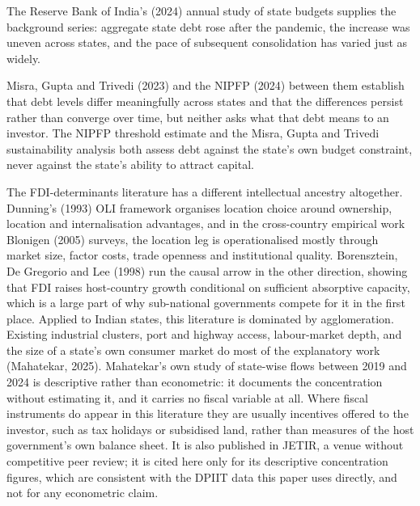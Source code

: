 \documentclass[12pt,a4paper]{article}
\begin{document}
The Reserve Bank of India's (2024) annual study of state budgets supplies the background series: aggregate state debt rose after the pandemic, the increase was uneven across states, and the pace of subsequent consolidation has varied just as widely.

Misra, Gupta and Trivedi (2023) and the NIPFP (2024) between them establish that debt levels differ meaningfully across states and that the differences persist rather than converge over time, but neither asks what that debt means to an investor. The NIPFP threshold estimate and the Misra, Gupta and Trivedi sustainability analysis both assess debt against the state's own budget constraint, never against the state's ability to attract capital.

The FDI-determinants literature has a different intellectual ancestry altogether. Dunning's (1993) OLI framework organises location choice around ownership, location and internalisation advantages, and in the cross-country empirical work Blonigen (2005) surveys, the location leg is operationalised mostly through market size, factor costs, trade openness and institutional quality. Borensztein, De Gregorio and Lee (1998) run the causal arrow in the other direction, showing that FDI raises host-country growth conditional on sufficient absorptive capacity, which is a large part of why sub-national governments compete for it in the first place. Applied to Indian states, this literature is dominated by agglomeration. Existing industrial clusters, port and highway access, labour-market depth, and the size of a state's own consumer market do most of the explanatory work (Mahatekar, 2025). Mahatekar's own study of state-wise flows between 2019 and 2024 is descriptive rather than econometric: it documents the concentration without estimating it, and it carries no fiscal variable at all. Where fiscal instruments do appear in this literature they are usually incentives offered to the investor, such as tax holidays or subsidised land, rather than measures of the host government's own balance sheet. It is also published in JETIR, a venue without competitive peer review; it is cited here only for its descriptive concentration figures, which are consistent with the DPIIT data this paper uses directly, and not for any econometric claim.
\end{document}
